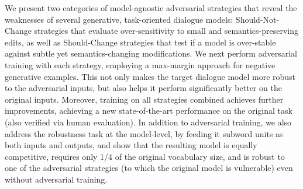 We present two categories of model-agnostic adversarial strategies that reveal the weaknesses of several generative, task-oriented dialogue models: Should-Not-Change strategies that evaluate over-sensitivity to small and semantics-preserving edits, as well as Should-Change strategies that test if a model is over-stable against subtle yet semantics-changing modifications. We next perform adversarial training with each strategy, employing a max-margin approach for negative generative examples. This not only makes the target dialogue model more robust to the adversarial inputs, but also helps it perform significantly better on the original inputs. Moreover, training on all strategies combined achieves further improvements, achieving a new state-of-the-art performance on the original task (also verified via human evaluation). In addition to adversarial training, we also address the robustness task at the model-level, by feeding it subword units as both inputs and outputs, and show that the resulting model is equally competitive, requires only 1/4 of the original vocabulary size, and is robust to one of the adversarial strategies (to which the original model is vulnerable) even without adversarial training.
